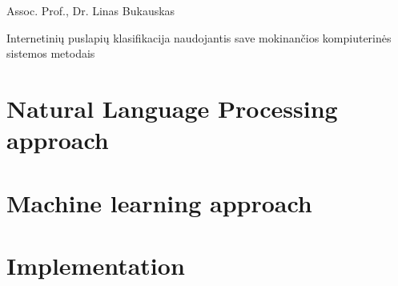 \documentclass[a4paper,12pt,fleqn]{article}
\begin{document}
 {}{}{}{}%
 {Assoc. Prof., Dr. Linas Bukauskas}

\tableofcontents



\bothabstracts{}%
{Internetinių puslapių klasifikacija naudojantis save mokinančios kompiuterinės sistemos metodais} %
{}%






\newpage

\section{Natural Language Processing approach}


\section{Machine learning approach}


\section{Implementation}





\end{document}
